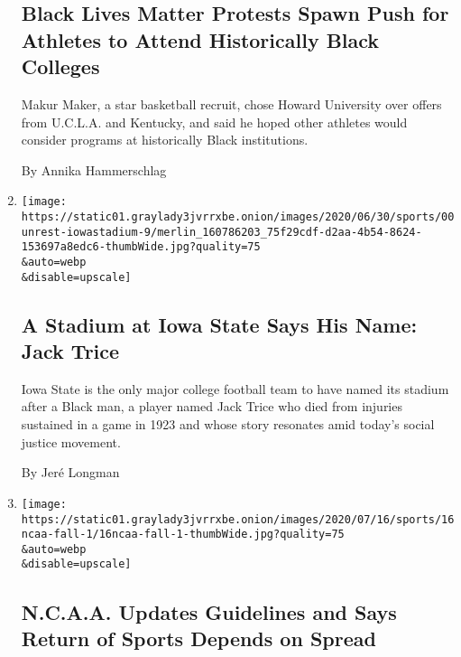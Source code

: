 \begin{enumerate}
{  \subsection{Black Lives Matter Protests Spawn Push for Athletes to
  Attend Historically Black
  Colleges}\label{black-lives-matter-protests-spawn-push-for-athletes-to-attend-historically-black-colleges}}

  Makur Maker, a star basketball recruit, chose Howard University over
  offers from U.C.L.A. and Kentucky, and said he hoped other athletes
  would consider programs at historically Black institutions.

  By Annika Hammerschlag
\item
  \href{/2020/07/20/sports/ncaafootball/Iowa-State-Jack-Trice-Stadium.html}{}

  \texttt{[image: https://static01.graylady3jvrrxbe.onion/images/2020/06/30/sports/00unrest-iowastadium-9/merlin\_160786203\_75f29cdf-d2aa-4b54-8624-153697a8edc6-thumbWide.jpg?quality=75\\\&auto=webp\\\&disable=upscale]}

  \hypertarget{a-stadium-at-iowa-state-says-his-name-jack-trice}{%
  \subsection{A Stadium at Iowa State Says His Name: Jack
  Trice}\label{a-stadium-at-iowa-state-says-his-name-jack-trice}}

  Iowa State is the only major college football team to have named its
  stadium after a Black man, a player named Jack Trice who died from
  injuries sustained in a game in 1923 and whose story resonates amid
  today's social justice movement.

  By Jeré Longman
\item
  \href{/2020/07/16/sports/ncaafootball/ncaa-guidelines-fall-sports.html}{}

  \texttt{[image: https://static01.graylady3jvrrxbe.onion/images/2020/07/16/sports/16ncaa-fall-1/16ncaa-fall-1-thumbWide.jpg?quality=75\\\&auto=webp\\\&disable=upscale]}

  \hypertarget{ncaa-updates-guidelines-and-says-return-of-sports-depends-on-spread}{%
  \subsection{N.C.A.A. Updates Guidelines and Says Return of Sports
  Depends on
  Spread}\label{ncaa-updates-guidelines-and-says-return-of-sports-depends-on-spread}}


\end{enumerate}
